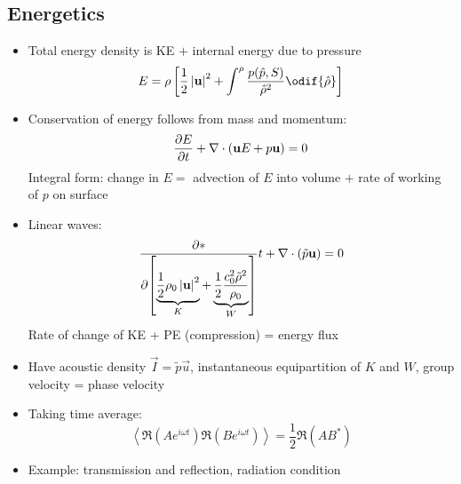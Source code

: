 \subsection*{Energetics}
\begin{itemize}
    \item Total energy density is KE $+$ internal energy due to pressure
    \[E = \rho\left[\frac{1}{2}\abs{\vec{u}}^2 + \int^\rho \frac{p(\hat{p},S)}{\hat{\rho}^2} \odif{\hat{\rho}}\right]\]
    \item Conservation of energy follows from mass and momentum: \[\frac{\partial{E}}{\partial{t}} + \nabla\cdot(\boldsymbol{\mathbf{u}}E+p\boldsymbol{\mathbf{u}})=0\]
    Integral form: change in $E = $ advection of $E$ into volume $+$ rate of working of $p$ on surface
    \item Linear waves: 
    \[\frac{\partial{*}}{\partial{ \left[ \underbrace{\frac{1}{2}\rho_0\left| \boldsymbol{\mathbf{u}} \right|^2}_{K} + \underbrace{\frac{1}{2}\frac{c_0^2 \tilde{\rho}^2}{\rho_0}}_{W} \right]}}{t} + \nabla\cdot(\tilde{p}\boldsymbol{\mathbf{u}}) = 0\]
    Rate of change of KE + PE (compression) = energy flux 

    \item Have acoustic density $\vec{I} =  \tilde{p}\vec{u}$, instantaneous equipartition of $K$ and $W$, group velocity = phase velocity
    \item Taking time average: \[\left\langle \Re(Ae^{i\omega t})\Re(Be^{i\omega t}) \right\rangle = \frac12 \Re(AB^*)\]
    \item Example: transmission and reflection, radiation condition
\end{itemize}
